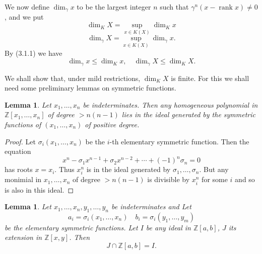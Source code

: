 \documentclass[leqno]{book}
\numberwithin{equation}{section}
\newtheorem{lemma}[theorem]{Lemma}
\theoremstyle{definition}
\begin{document}
            We now define $\operatorname{dim}_{\gamma}x$ to be the largest integer $n$ such that $\gamma^{n}(x-\operatorname{rank}x)\neq 0$, and we put
            \begin{equation*}
              \operatorname{dim}_{K}X= \sup_{x\in K(X)} \operatorname{dim}_{K}x
            \end{equation*}
            \begin{equation*}
              \operatorname{dim}_{\gamma}X=\sup_{x\in K(X)} \operatorname{dim}_{\gamma} x.
            \end{equation*}
            By (3.1.1) we have
            \begin{equation*}
              \operatorname{dim}_{\gamma}x\le \operatorname{dim}_{K}x,\quad \operatorname{dim}_{\gamma}X\le \operatorname{dim}_{K}X.
            \end{equation*}

            We shall show that, under mild restrictions, $\operatorname{dim}_{K}X$ is finite. For this we shall need some preliminary lemmas on symmetric functions.

            \begin{lemma}
              Let $x_1, \ldots ,x_{n}$ be indeterminates. Then any homogeneous polynomial in $\mathbb{Z}[x_1, \ldots ,x_{n}]$ of degree $>n(n-1)$ lies in the ideal generated by the symmetric functions of $(x_1, \ldots ,x_{n})$ of positive degree.
            \end{lemma}

            \begin{proof}
              Let $\sigma _{i}(x_1, \ldots ,x_{n})$ be the $i$-th elementary symmetric function. Then the equation
              \begin{equation*}
                x^{n}-\sigma_1 x^{n-1}+\sigma_2 x^{n-2}+ \cdots +(-1)^{n}\sigma_{n}=0
              \end{equation*}
              has roots $x=x_{i}$. Thus $x_{i}^{n}$ is in the ideal generated by $\sigma_1, \ldots ,\sigma_{n}$. But any monimial in $x_1, \ldots ,x_{n}$ of degree $>n(n-1)$ is divisible by $x_{i}^{n}$ for some $i$ and so is also in this ideal.
            \end{proof}

            \begin{lemma}
              Let $x_1, \ldots ,x_{n},y_1, \ldots ,y_{n}$ be indeterminates and Let
              \begin{equation*}
                a_{i}=\sigma_{i}(x_1, \ldots ,x_{n})\quad b_{i}=\sigma_{i}(y_1, \ldots ,y_{m})
              \end{equation*}
              be the elementary symmetric functions. Let $I$ be any ideal in $\mathbb{Z}[a,b]$, $J$ its extension in $\mathbb{Z}[x,y]$. Then
              \begin{equation*}
                J\cap \mathbb{Z}[a,b]=I.
              \end{equation*}
            \end{lemma}
\end{document}
